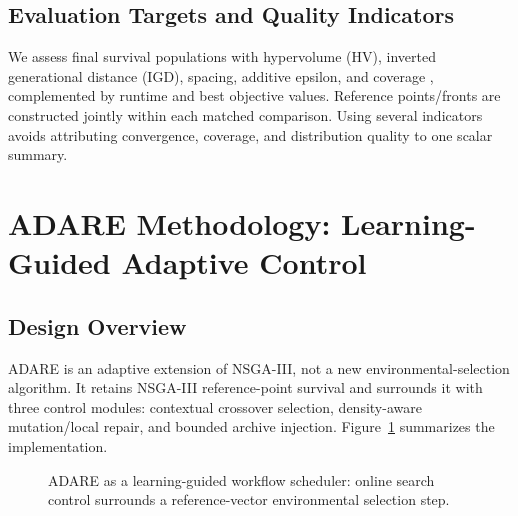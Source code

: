 \documentclass[preprint,12pt]{elsarticle}
\begin{document}
\subsection{Evaluation Targets and Quality Indicators}
We assess final survival populations with hypervolume (HV), inverted generational distance (IGD), spacing, additive epsilon, and coverage \cite{zitzler2003performance}, complemented by runtime and best objective values. Reference points/fronts are constructed jointly within each matched comparison. Using several indicators avoids attributing convergence, coverage, and distribution quality to one scalar summary.

\section{ADARE Methodology: Learning-Guided Adaptive Control}
\subsection{Design Overview}
ADARE is an adaptive extension of NSGA-III, not a new environmental-selection algorithm. It retains NSGA-III reference-point survival and surrounds it with three control modules: contextual crossover selection, density-aware mutation/local repair, and bounded archive injection. Figure~\ref{fig:adare_structure} summarizes the implementation.

\begin{figure}[t]
\centering
{}
\caption{ADARE as a learning-guided workflow scheduler: online search control surrounds a reference-vector environmental selection step.}
\label{fig:adare_structure}
\end{figure}
\end{document}
